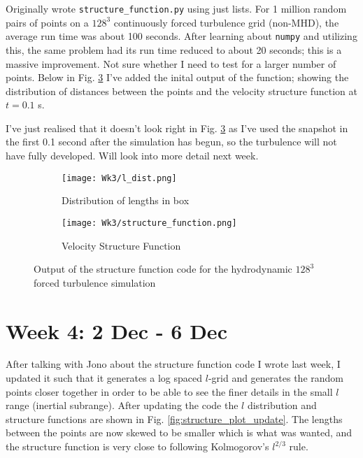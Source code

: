 \documentclass[12pt,letterpaper]{article}
\begin{document}
  Originally wrote \verb|structure_function.py| using just lists. For 1 million random pairs of points on a $128^3$ continuously forced turbulence grid (non-MHD), the average run time was about 100 seconds. After learning about \verb|numpy| and utilizing this, the same problem had its run time reduced to about 20 seconds; this is a massive improvement. Not sure whether I need to test for a larger number of points. Below in Fig. \ref{fig:structure_plots} I've added the inital output of the function; showing the distribution of distances between the points and the velocity structure function at $t=0.1$ s.

  I've just realised that it doesn't look right in Fig. \ref{fig:structure_plots} as I've used the snapshot in the first 0.1 second after the simulation has begun, so the turbulence will not have fully developed. Will look into more detail next week.

  \begin{figure}[!h]
   \centering
  \begin{subfigure}{.4\linewidth}
    \centering
  \texttt{[image: Wk3/l\_dist.png]}
  \caption{Distribution of lengths in box}
  \label{fig:l_dist}
  \end{subfigure}
  \begin{subfigure}{.4\linewidth}
    \centering
  \texttt{[image: Wk3/structure\_function.png]}
  \caption{Velocity Structure Function}
  \label{fig:struct_func}
  \end{subfigure}

  \caption{Output of the structure function code for the hydrodynamic $128^3$ forced turbulence simulation}
  \label{fig:structure_plots}
  \end{figure}

  \newpage
  \section*{Week 4: 2 Dec - 6 Dec}
  After talking with Jono about the structure function code I wrote last week, I updated it such that it generates a log spaced $l$-grid and generates the random points closer together in order to be able to see the finer details in the small $l$ range (inertial subrange). After updating the code the $l$ distribution and structure functions are shown in Fig. \ref{fig:structure_plot_update}. The lengths between the points are now skewed to be smaller which is what was wanted, and the structure function is very close to following Kolmogorov's $l^{2/3}$ rule.
\end{document}
